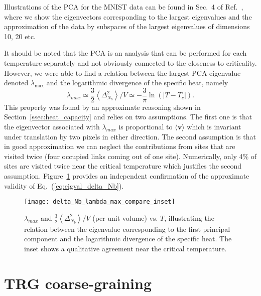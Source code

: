 \documentclass[../main.tex]{subfiles}
\begin{document}
Illustrations of the PCA for the MNIST data can be found in Sec.~4 of Ref.~\cite{foreman2017}, where we show the
eigenvectors corresponding to the largest eigenvalues and the approximation of the data by subspaces of the largest
eigenvalues of dimensions 10, 20 etc. 

It should be noted that the PCA is an analysis that can be performed for each temperature separately and not obviously
connected to the closeness to criticality. However, we were able to find a relation between the largest PCA eigenvalue
denoted $\lambda_{\max}$ and the logarithmic divergence of the specific heat, namely
\begin{equation}
    \lambda_{max} \simeq \frac{3}{2}\left \langle \Delta_{N_b}^2
    \right\rangle/V\simeq -\frac{3}{\pi}\ln(|T-T_c|).
    \label{eq:eigval_delta_Nb}
\end{equation}
This property was found by an approximate reasoning shown in Section~\ref{ssec:heat_capacity} and relies on two
assumptions.  The first one is that the eigenvector associated with $\lambda_{max}$ is proportional to $\langle
\mathbf{v}\rangle$ which is invariant under translation by two pixels in either direction. The second assumption is
that in good approximation we can neglect the contributions from sites that are visited twice (four occupied links
coming out of one site).  Numerically, only 4\% of sites are visited twice near the critical temperature which
justifies the second assumption.  Figure~\ref{fig:eigval_fluctuations_unblocked} provides an independent confirmation
of the approximate validity of Eq.~(\ref{eq:eigval_delta_Nb}). 
\begin{figure}[htpb]
    \centering
    \texttt{[image: delta\_Nb\_lambda\_max\_compare\_inset]}\hfill
    \caption{$\lambda_{max}$ and $\frac{3}{2}\left \langle \Delta_{N_b}^2
        \right\rangle / V$ (per unit volume) vs. $T$, illustrating the relation
        between the eigenvalue corresponding to the first principal component
        and the logarithmic divergence of the specific heat. The inset shows a
    qualitative agreement near the critical temperature.}
    \label{fig:eigval_fluctuations_unblocked}
\end{figure}

\section{TRG coarse-graining}%
\label{sec:trg}
\end{document}
